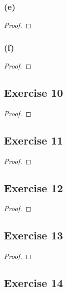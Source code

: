 \documentclass[14pt]{extarticle}
\begin{document}
\subsubsection{(e)}

\begin{proof}

\end{proof}

\subsubsection{(f)}

\begin{proof}

\end{proof}

\subsection{Exercise 10}

\begin{proof}

\end{proof}

\subsection{Exercise 11}

\begin{proof}

\end{proof}

\subsection{Exercise 12}

\begin{proof}

\end{proof}

\subsection{Exercise 13}

\begin{proof}

\end{proof}

\subsection{Exercise 14}
\end{document}
